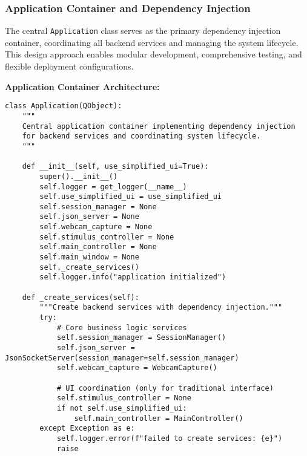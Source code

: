 \documentclass[12pt,a4paper]{article}
\begin{document}
\subsubsection{Application Container and Dependency Injection}

The central \texttt{Application} class serves as the primary dependency injection container, coordinating all backend services
and managing the system lifecycle. This design approach enables modular development, comprehensive testing, and flexible
deployment configurations.

\textbf{Application Container Architecture:}

\begin{verbatim}
class Application(QObject):
    """
    Central application container implementing dependency injection
    for backend services and coordinating system lifecycle.
    """
    
    def __init__(self, use_simplified_ui=True):
        super().__init__()
        self.logger = get_logger(__name__)
        self.use_simplified_ui = use_simplified_ui
        self.session_manager = None
        self.json_server = None
        self.webcam_capture = None
        self.stimulus_controller = None
        self.main_controller = None
        self.main_window = None
        self._create_services()
        self.logger.info("application initialized")
    
    def _create_services(self):
        """Create backend services with dependency injection."""
        try:
            # Core business logic services
            self.session_manager = SessionManager()
            self.json_server = JsonSocketServer(session_manager=self.session_manager)
            self.webcam_capture = WebcamCapture()
            
            # UI coordination (only for traditional interface)
            self.stimulus_controller = None
            if not self.use_simplified_ui:
                self.main_controller = MainController()
        except Exception as e:
            self.logger.error(f"failed to create services: {e}")
            raise
    

\end{verbatim}
\end{document}

